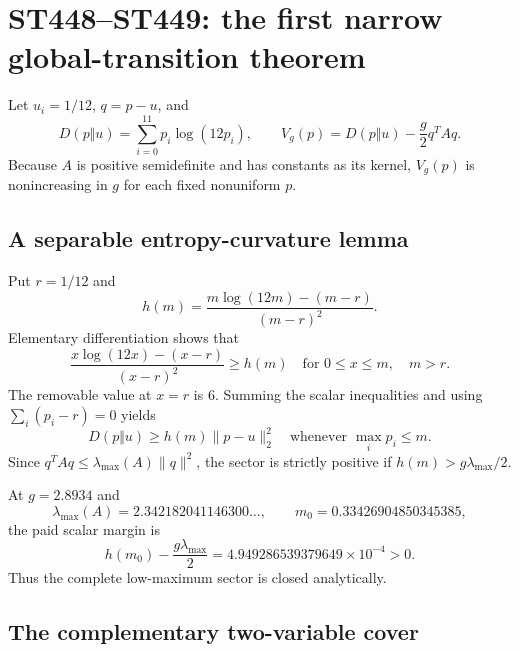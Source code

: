 \documentclass[11pt,a4paper]{article}
\begin{document}
\section{ST448--ST449: the first narrow global-transition theorem}

Let $u_i=1/12$, $q=p-u$, and
\begin{equation}\label{eq:V}
 D(p\Vert u)=\sum_{i=0}^{11}p_i\log(12p_i),\qquad
 V_g(p)=D(p\Vert u)-\frac g2q^TAq.
\end{equation}
Because $A$ is positive semidefinite and has constants as its kernel, $V_g(p)$
is nonincreasing in $g$ for each fixed nonuniform $p$.

\subsection{A separable entropy-curvature lemma}

Put $r=1/12$ and
\begin{equation}\label{eq:h}
 h(m)=\frac{m\log(12m)-(m-r)}{(m-r)^2}.
\end{equation}
Elementary differentiation shows that
\[
 \frac{x\log(12x)-(x-r)}{(x-r)^2}\ge h(m)
 \quad\text{for }0\le x\le m,\quad m>r.
\]
The removable value at $x=r$ is $6$.  Summing the scalar inequalities and
using $\sum_i(p_i-r)=0$ yields
\begin{equation}\label{eq:sep}
 D(p\Vert u)\ge h(m)\lVert p-u\rVert_2^2
 \quad\text{whenever }\max_i p_i\le m.
\end{equation}
Since $q^TAq\le\lambda_{\max}(A)\lVert q\rVert^2$, the sector is strictly
positive if $h(m)>g\lambda_{\max}/2$.

At $g=2.8934$ and
\[
 \lambda_{\max}(A)=2.342182041146300\ldots,
 \qquad m_0=0.33426904850345385,
\]
the paid scalar margin is
\[
 h(m_0)-\frac{g\lambda_{\max}}2
 =4.949286539379649\times10^{-4}>0.
\]
Thus the complete low-maximum sector is closed analytically.

\subsection{The complementary two-variable cover}
\end{document}
